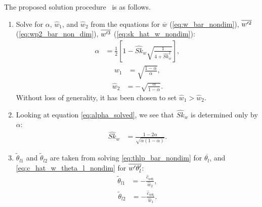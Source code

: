 The proposed solution procedure~\cite{larson2005using} is as follows.
\begin{enumerate}
    \item Solve for $\alpha$, $\widehat{w}_1$,
    and $\widehat{w}_2$ from the equations for $\overline{w}$ (\cref{eq:w_bar_nondim}),
    $\overline{w'^2}$ (\cref{eq:wp2_bar_non_dim}), $\overline{w'^3}$ (\cref{eq:sk_hat_w_nondim}):
    \begin{align}
        \label{eq:alpha_solved}
        \alpha
        &= \frac{1}{2}\left[1 - \widehat{Sk}_w \sqrt{\frac{1}{4 + \widehat{Sk}_w^2}}\right],
    \end{align}
    \begin{align}
        \label{eq:w1_solved}
        \widehat{w}_1
        &= \sqrt{\frac{1-\alpha}{\alpha}},
    \end{align}
    \begin{align}
        \label{eq:w2_solved}
        \widehat{w}_2
        &= -\sqrt{\frac{\alpha}{1-\alpha}}.
    \end{align}
    Without loss of generality, it has been chosen to set $\widehat{w}_1 > \widehat{w}_2$.

    \item Looking at equation \cref{eq:alpha_solved},
    we see that $\widehat{Sk}_w$ is determined only by $\alpha$:
    \begin{align}
        \label{eq:sk_w_alpha}
        \widehat{Sk}_w
        &= \frac{1-2\alpha}{\sqrt{\alpha(1-\alpha)}}.
    \end{align}

    \item $\tilde{\theta}_{l1}$ and $\tilde{\theta}_{l2}$ are taken from solving \cref{eq:thlp_bar_nondim}
    for $\overline{\theta_l}$, and \cref{eq:c_hat_w_theta_l_nondim} for $\overline{w' \theta_l'}$:
    \begin{align}
        \label{eq:thl1_tilde_solved}
        \tilde{\theta}_{l1}
        &= -\frac{\widehat{c}_{w \theta_l}}{\widehat{w}_2},
    \end{align}
    \begin{align}
        \label{eq:thl2_tilde_solved}
        \tilde{\theta}_{l2}
        &= -\frac{\widehat{c}_{w \theta_l}}{\widehat{w}_1}.
    \end{align}


\end{enumerate}
